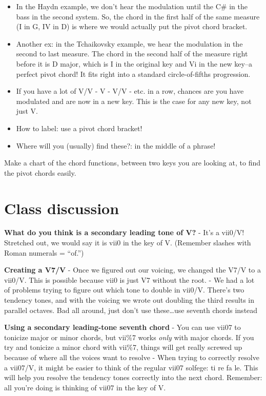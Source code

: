 \documentclass{book}
\begin{document}
\begin{itemize}
\item
  In the Haydn example, we don't hear the modulation until the C\# in the bass
  in the second system. So, the chord in the first half of the same measure (I
  in G, IV in D) is where we would actually put the pivot chord bracket.
\item
  Another ex: in the Tchaikovsky example, we hear the modulation in the second
  to last measure. The chord in the second half of the measure right before it
  is D major, which is I in the original key and Vi in the new key--a perfect
  pivot chord! It fits right into a standard circle-of-fifths progression.
\item
  If you have a lot of V/V - V - V/V - etc. in a row, chances are you have
  modulated and are now in a new key. This is the case for any new key, not
  just V.
\item
  How to label: use a pivot chord bracket!
\item
  Where will you (usually) find these?: in the middle of a phrase!
\end{itemize}

Make a chart of the chord functions, between two keys you are looking at, to
find the pivot chords easily.

\hypertarget{class-discussion-44}{%
\chapter{Class discussion}\label{class-discussion-44}}

\textbf{What do you think is a secondary leading tone of V?} - It's a vii0/V!
Stretched out, we would say it is vii0 in the key of V. (Remember slashes with
Roman numerals = ``of.'')

\textbf{Creating a V7/V} - Once we figured out our voicing, we changed the
V7/V to a vii0/V. This is possible because vii0 is just V7 without the root. -
We had a lot of problems trying to figure out which tone to double in vii0/V.
There's two tendency tones, and with the voicing we wrote out doubling the
third results in parallel octaves. Bad all around, just don't use
these\ldots use seventh chords instead

\textbf{Using a secondary leading-tone seventh chord} - You can use vii07 to
tonicize major or minor chords, but vii\%7 works \emph{only} with major
chords. If you try and tonicize a minor chord with vii\%7, things will get
really screwed up because of where all the voices want to resolve - When
trying to correctly resolve a vii07/V, it might be easier to think of the
regular vii07 solfege: ti re fa le. This will help you resolve the tendency
tones correctly into the next chord. Remember: all you're doing is thinking of
vii07 in the key of V.
\end{document}
